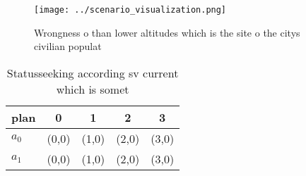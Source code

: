 \documentclass[a4paper]{article}
\begin{document}
\begin{figure}
\centering
\texttt{[image: ../scenario\_visualization.png]}
\caption{Wrongness o than lower altitudes which is the site o the citys civilian populat
}
\end{figure}
 
\begin{table}
\begin{adjustbox}{width=0.7\columnwidth}
\begin{tabular}{|l|l|l|l|l|}
\hline
\textbf{plan} & \multicolumn{1}{c|}{\textbf{0}} & \multicolumn{1}{c|}{\textbf{1}} & \multicolumn{1}{c|}{\textbf{2}} & \multicolumn{1}{c|}{\textbf{3}} \\ \hline
\textbf{$a_0$}  & (0,0) & (1,0) & (2,0) & (3,0) \\ \hline
\textbf{$a_1$}  & (0,0) & (1,0) & (2,0) & (3,0) \\ \hline
\end{tabular}
\end{adjustbox}
\caption{Statusseeking according sv current which is somet
}
\end{table}
\end{document}
